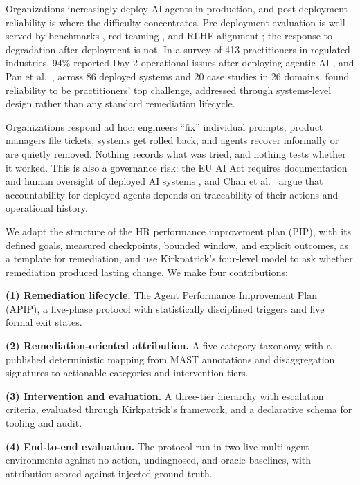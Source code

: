 \documentclass[conference]{IEEEtran}
\begin{document}
Organizations increasingly deploy AI agents in production, and post-deployment reliability is where the difficulty concentrates. Pre-deployment evaluation is well served by benchmarks \cite{ref1}, red-teaming \cite{ref2}, and RLHF alignment \cite{ref3}; the response to degradation after deployment is not. In a survey of 413 practitioners in regulated industries, 94\% reported Day 2 operational issues after deploying agentic AI \cite{ref4}, and Pan et al.~\cite{ref5}, across 86 deployed systems and 20 case studies in 26 domains, found reliability to be practitioners' top challenge, addressed through systems-level design rather than any standard remediation lifecycle.

Organizations respond ad hoc: engineers ``fix'' individual prompts, product managers file tickets, systems get rolled back, and agents recover informally or are quietly removed. Nothing records what was tried, and nothing tests whether it worked. This is also a governance risk: the EU AI Act requires documentation and human oversight of deployed AI systems \cite{ref6}, and Chan et al.~\cite{ref14} argue that accountability for deployed agents depends on traceability of their actions and operational history.

We adapt the structure of the HR performance improvement plan (PIP), with its defined goals, measured checkpoints, bounded window, and explicit outcomes, as a template for remediation, and use Kirkpatrick's four-level model \cite{ref7} to ask whether remediation produced lasting change. We make four contributions:

\noindent\textbf{(1) Remediation lifecycle.} The Agent Performance Improvement Plan (APIP), a five-phase protocol with statistically disciplined triggers and five formal exit states.

\noindent\textbf{(2) Remediation-oriented attribution.} A five-category taxonomy with a published deterministic mapping from MAST annotations \cite{ref8} and disaggregation signatures to actionable categories and intervention tiers.

\noindent\textbf{(3) Intervention and evaluation.} A three-tier hierarchy with escalation criteria, evaluated through Kirkpatrick's framework, and a declarative schema for tooling and audit.

\noindent\textbf{(4) End-to-end evaluation.} The protocol run in two live multi-agent environments against no-action, undiagnosed, and oracle baselines, with attribution scored against injected ground truth.
\end{document}
